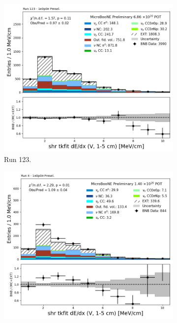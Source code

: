 \begin{figure}[H]
    \centering
    \begin{subfigure}[t]{0.32\linewidth}
        \includegraphics[width=\linewidth]{technote/Appendix_Preselection/Figures/1e0p0pi/Run123/shr_tkfit_gap10_dedx_V_Run123_1e0p0pi_Presel.png}
        \caption{Run 123.}
    \end{subfigure}%
    \hspace{0.2cm}%
    \begin{subfigure}[t]{0.32\linewidth}
        \includegraphics[width=\linewidth]{technote/Appendix_Preselection/Figures/1e0p0pi/Run4b/shr_tkfit_gap10_dedx_V_Run4b_1e0p0pi_Presel.png}

\end{subfigure}
\end{figure}
